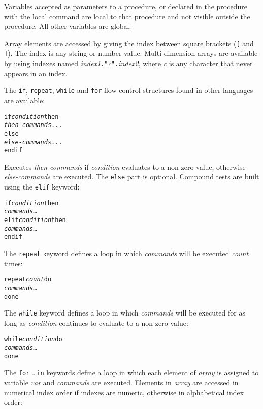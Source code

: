 Variables accepted as parameters to a procedure, or declared in the procedure
with the local command are local to that procedure and not visible outside the
procedure.  All other variables are global.

Array elements are accessed by giving the index between
square brackets (\texttt{[} and \texttt{]}).
The index is any string or number value.
Multi-dimension arrays are available by using
indexes named \textit{index1}\texttt{."}\textit{c}\texttt{".}\textit{index2},
where \textit{c} is any character that never appears in an index.

The \texttt{if}, \texttt{repeat}, \texttt{while} and \texttt{for}
flow control structures
found in other languages are available:

\begin{alltt}
if \textit{condition} then
  \textit{then-commands} ...
else
  \textit{else-commands} ...
endif
\end{alltt}

Executes \textit{then-commands} if \textit{condition} evaluates to
a non-zero value, otherwise \textit{else-commands} are executed.
The \texttt{else} part is optional.
Compound tests are built using the \texttt{elif} keyword:

\begin{alltt}
if \textit{condition} then
  \textit{commands} \dots
elif \textit{condition} then
  \textit{commands} \dots
endif
\end{alltt}

The \texttt{repeat} keyword defines a loop in which
\textit{commands} will be executed \textit{count}
times:

\begin{alltt}
repeat \textit{count} do
  \textit{commands} \dots
done
\end{alltt}

The \texttt{while} keyword defines a loop in which
\textit{commands} will be executed for as long
as \textit{condition} continues to evaluate to a non-zero value:

\begin{alltt}
while \textit{condition} do
  \textit{commands} \dots
done
\end{alltt}

The \texttt{for} \dots \texttt{in} keywords define a loop in which
each element of \textit{array} is assigned to variable \textit{var}
and \textit{commands} are executed.
Elements in \textit{array} are accessed in numerical index order if
indexes are numeric, otherwise in alphabetical index order:

